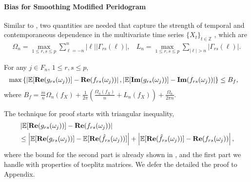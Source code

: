 \paragraph{Bias for Smoothing Modified Peridogram} Similar to \cite{sun2018large}, two quantities are needed that capture the strength of temporal and contemporaneous dependence in the multivariate time series $\{X_t\}_{t \in \mathbb{Z}}$ , which are 
\begin{eqnarray}
\Omega_{n} = \max_{1 \le r,s \le p} \sum_{\ell=-n}^n |\ell| |\Gamma_{rs}(\ell)|, ~~~~ L_n = \max_{1 \le r,s \le p}\sum_{|\ell|>n} |\Gamma_{rs}(\ell)|.
\end{eqnarray}
\begin{lem}
\label{lemma:bound_deviation}
For any $j\in F_n$, $1\le r, s\le p$, 
\begin{equation}
\begin{aligned}
&\max\left\{\left|\mathbb{E}[{\bf Re}(g_{rs}(\omega_j))] - {\bf Re}(f_{rs}(\omega_j))\right|, \left|\mathbb{E}[{\bf Im}(g_{rs}(\omega_j))] - {\bf Im}(f_{rs}(\omega_j))\right|\right\} \le B_f,
\end{aligned}
\end{equation}
where $B_f = \frac{m}{n}\Omega_n(f_X) + \frac{1}{2\pi}\left(\frac{\Omega_n(f_X)}{n}+L_n(f_X)\right) +\frac{\Omega_n}{2\pi n}$.
\end{lem}
The technique for proof starts with triangular inequality, 
\begin{equation}
\begin{aligned}
&\left|\mathbb{E}[{\bf Re}(g_{rs}(\omega_j))] - {\bf Re}(f_{rs}(\omega_j))\right| \\
&\le \left|\mathbb{E}[{\bf Re}(g_{rs}(\omega_j))] - \mathbb{E}[{\bf Re}(\hat{f}_{rs}(\omega_j))]\right|+\left|\mathbb{E}[{\bf Re}(\hat{f}_{rs}(\omega_j))] - {\bf Re}(f_{rs}(\omega_j))\right|, 
\end{aligned}
\end{equation}
where the bound for the second part is already shown in \cite{sun2018large}, and the first part we handle with properties of toeplitz matrices. We defer the detailed the proof to Appendix. 
